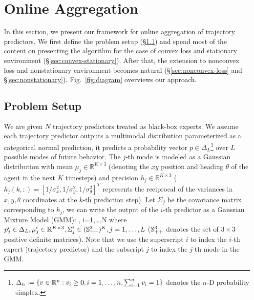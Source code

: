 \section{Online Aggregation}
\label{sec:online-agg}

In this section, we present our framework for online aggregation of trajectory predictors. We first define the problem setup (\S\ref{sec:problem-setup}) and spend most of the content on presenting the algorithm for the case of convex loss and stationary environment (\S\ref{sec:convex-stationary}). After that, the extension to nonconvex loss and nonstationary environment becomes natural (\S\ref{sec:nonconvex-loss} and \S\ref{sec:nonstationary}). Fig.~\ref{fig:diagram} overviews our approach.
\vspace{-2mm}

\vspace{-6mm}

\subsection{Problem Setup}
\label{sec:problem-setup}
We are given $N$ trajectory predictors treated as black-box experts.
We assume each trajectory predictor outputs a multimodal distribution parameterized as a categorical normal prediction, \ie it predicts a probability vector $p \in \Delta_L$\footnote{$\Delta_n := \{ v \in { {\mathbb R}^{n} } : v_i \geq 0, i=1,\dots,n, \sum_{i=1}^n v_i =1 \}$ denotes the $n$-D probability simplex.} over $L$ possible modes of future behavior. The $j$-th mode is modeled as a Gaussian distribution with mean $\mu_j \in \mathbb{R}^{K\times3}$ (denoting the $xy$ position and heading $\theta$ of the agent in the next $K$ timesteps) and precision $h_j \in \mathbb{R}^{K\times3}$ (\eg $h_j(k,:) = [1/\sigma_x^2, 1/\sigma_y^2,1/\sigma_{\theta}^2]^T$ represents the reciprocal of the variances in $x,y,\theta$ coordinates at the $k$-th prediction step). 
Let $\Sigma_j$ be the covariance matrix corresponding to $h_j$,
we can write the output of the $i$-th predictor as a Gaussian Mixture Model (GMM):
\bea \label{eq:individual-GMM}
, \quad i=1,\dots,N
\eea
where $p^i_j \in \Delta_L, \mu^i_j \in { {\mathbb R}^{K \times 3} }, \Sigma_j^i \in (\mathbb{S}^{3}_{++})^K, j=1,\dots,L$ ($\mathbb{S}^{3}_{++}$ denotes the set of $3\times 3$ positive definite matrices). Note that we use the superscript $i$ to index the $i$-th expert (trajectory predictor) and the subscript $j$ to index the $j$-th mode in the GMM.

